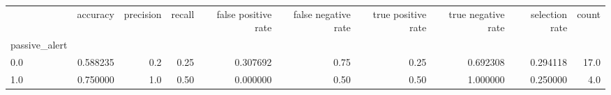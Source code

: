 \begin{tabular}{lrrrrrrrrr}
\toprule
{} &  accuracy &  precision &  recall &  false positive rate &  false negative rate &  true positive rate &  true negative rate &  selection rate &  count \\
passive\_alert &           &            &         &                      &                      &                     &                     &                 &        \\
\midrule
0.0           &  0.588235 &        0.2 &    0.25 &             0.307692 &                 0.75 &                0.25 &            0.692308 &        0.294118 &   17.0 \\
1.0           &  0.750000 &        1.0 &    0.50 &             0.000000 &                 0.50 &                0.50 &            1.000000 &        0.250000 &    4.0 \\
\bottomrule
\end{tabular}
